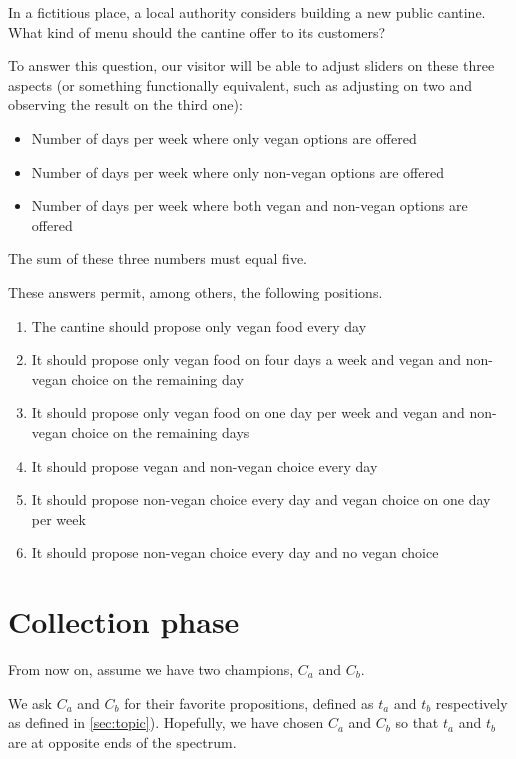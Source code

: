 \documentclass[version=3.21, pagesize, twoside=off, bibliography=totoc, DIV=calc, fontsize=12pt, a4paper]{scrartcl}
\begin{document}
In a fictitious place, a local authority considers building a new public cantine. What kind of menu should the cantine offer to its customers?

To answer this question, our visitor will be able to adjust sliders on these three aspects (or something functionally equivalent, such as adjusting on two and observing the result on the third one):
\begin{itemize}
	\item Number of days per week where only vegan options are offered
	\item Number of days per week where only non-vegan options are offered 
	\item Number of days per week where both vegan and non-vegan options are offered
\end{itemize}
The sum of these three numbers must equal five.

These answers permit, among others, the following positions.
\begin{enumerate}
	\item \label{it:vegan} The cantine should propose only vegan food every day
	\item \label{it:four} It should propose only vegan food on four days a week and vegan and non-vegan choice on the remaining day
	\item \label{it:one} It should propose only vegan food on one day per week and vegan and non-vegan choice on the remaining days
	\item \label{it:zero} It should propose vegan and non-vegan choice every day
	\item It should propose non-vegan choice every day and vegan choice on one day per week
	\item It should propose non-vegan choice every day and no vegan choice
\end{enumerate}

\section{Collection phase}
From now on, assume we have two champions, $C_a$ and $C_b$.

We ask $C_a$ and $C_b$ for their favorite propositions, defined as $t_a$ and $t_b$ respectively as defined in \cref{sec:topic}). Hopefully, we have chosen $C_a$ and $C_b$ so that $t_a$ and $t_b$ are at opposite ends of the spectrum. 
\end{document}
